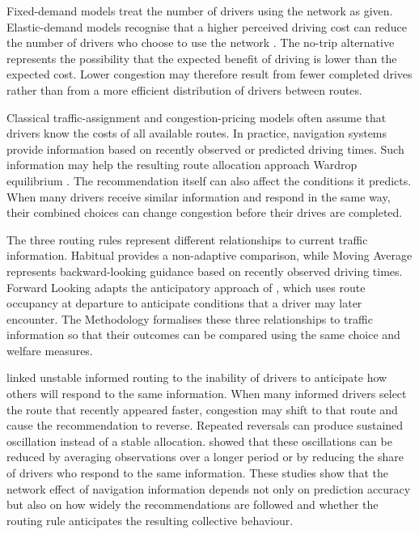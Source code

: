 \documentclass{article}
\begin{document}
Fixed-demand models treat the number of drivers using the network as given. Elastic-demand models recognise that a higher perceived driving cost can reduce the number of drivers who choose to use the network \parencite{matsoukisMichalopoulos1986,gartner1980,arnottDePalmaLindsey1993,rouwendalVerhoef2006}. The no-trip alternative represents the possibility that the expected benefit of driving is lower than the expected cost. Lower congestion may therefore result from fewer completed drives rather than from a more efficient distribution of drivers between routes.

Classical traffic-assignment and congestion-pricing models often assume that drivers know the costs of all available routes. In practice, navigation systems provide information based on recently observed or predicted driving times. Such information may help the resulting route allocation approach Wardrop equilibrium \parencite{davis2009}. The recommendation itself can also affect the conditions it predicts. When many drivers receive similar information and respond in the same way, their combined choices can change congestion before their drives are completed.

The three routing rules represent different relationships to current traffic information. Habitual provides a non-adaptive comparison, while Moving Average represents backward-looking guidance based on recently observed driving times. Forward Looking adapts the anticipatory approach of \textcite{davis2009}, which uses route occupancy at departure to anticipate conditions that a driver may later encounter. The Methodology formalises these three relationships to traffic information so that their outcomes can be compared using the same choice and welfare measures.

\Textcite{wahleEtAl2002} linked unstable informed routing to the inability of drivers to anticipate how others will respond to the same information. When many informed drivers select the route that recently appeared faster, congestion may shift to that route and cause the recommendation to reverse. Repeated reversals can produce sustained oscillation instead of a stable allocation. \Textcite{krallEtAl2021} showed that these oscillations can be reduced by averaging observations over a longer period or by reducing the share of drivers who respond to the same information. These studies show that the network effect of navigation information depends not only on prediction accuracy but also on how widely the recommendations are followed and whether the routing rule anticipates the resulting collective behaviour.
\end{document}
